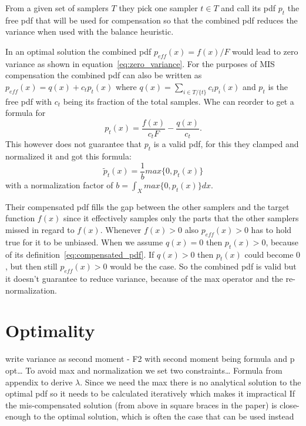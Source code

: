 From a given set of samplers $ T $ they pick one sampler $ t \in T $ and call its pdf $ p_t $ the free pdf that will be used for compensation
so that the combined pdf reduces the variance when used with the balance heuristic.

In an optimal solution the combined pdf $ p_{eff}(x) = f(x)/F $ would lead to zero variance as shown in equation~\ref{eq:zero_variance}.
For the purposes of MIS compensation the combined pdf can also be written as $ p_{eff}(x) = q(x) + c_t p_t(x) $ where $ q(x) = \sum_{i \in T/\{t\}} c_i p_i(x) $
and $ p_t $ is the free pdf with $ c_t $ being its fraction of the total samples.
Whe can reorder to get a formula for
\begin{equation}
    \label{eq:compensated_pdf}
    p_t(x) = \frac{f(x)}{c_t F} - \frac{q(x)}{c_t}.
\end{equation}
This however does not guarantee that $ p_t $ is a valid pdf,
for this they clamped and normalized it and got this formula: $$ \tilde{p}_t(x) = \frac{1}{b} max\{0, p_t(x)\} $$ with a normalization factor of $ b = \int_X max\{0, p_t(x)\} dx $.

Their compensated pdf fills the gap between the other samplers and the target function $ f(x) $
since it effectively samples only the parts that the other samplers missed in regard to $ f(x) $.
Whenever $ f(x) > 0 $ also $ p_{eff}(x) > 0 $ has to hold true for it to be unbiased.
When we assume $ q(x) = 0 $ then $ p_t(x) > 0 $, because of its definition~\ref{eq:compensated_pdf}.
If $ q(x) > 0 $ then $ p_t(x) $ could become $ 0 $, but then still $ p_{eff}(x) > 0 $ would be the case.
So the combined pdf is valid but it doesn't guarantee to reduce variance, because of the max operator and the re-normalization.


\section{Optimality}
\label{sec:misc_optimality}
write variance as second moment - F2 with second moment being formula and p opt\dots
To avoid max and normalization we set two constraints\dots
Formula from appendix to derive $ \lambda $.
Since we need the max there is no analytical solution to the optimal pdf so it needs to be calculated iteratively which makes it impractical
If the mis-compensated solution (from above in square braces in the paper) is close-enough to the optimal solution, which is often the case that can be used instead

